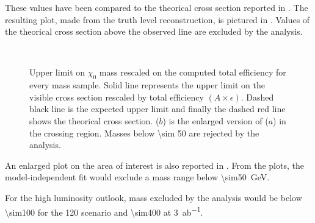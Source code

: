 These values have been compared to the theorical cross section reported in \Tab{\ref{tab:eff}}. The resulting plot, made from the truth level reconstruction, is pictured in \Fig{\ref{subfig:exclMI}}. Values of the theorical cross section above the observed line are excluded by the analysis.

\begin{figure}[tp]
\centering
{} \\
 \quad
\caption{Upper limit on $\chi_0$ mass rescaled on the computed total efficiency for every mass sample. Solid line represents the upper limit on the visible cross section rescaled by total efficiency $\left(A\times\epsilon\right)$. Dashed black line is the expected upper limit and finally the dashed red line shows the theorical cross section. ($b$) is the enlarged version of ($a$) in the crossing region. Masses below \SI{\sim 50}{\gev} are rejected by the analysis.}
\label{fig:exclMI}
\end{figure}


An enlarged plot on the area of interest is also reported in  \Fig{\ref{subfig:exclMIZ}}. From the plots, the model-independent fit would exclude a mass range below \SI{\sim50}{\GeV}.

For the high luminosity outlook, mass excluded by the analysis would be below \SI{\sim100}{\gev} for the \SI{120}{\ifb} scenario and \SI{\sim400}{\gev} at \SI{3}{ab^{-1}}. 



